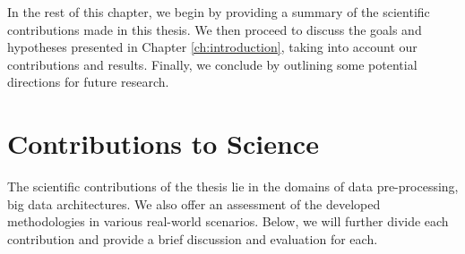 In the rest of this chapter, we begin by providing a summary of the scientific contributions made in this thesis. 
We then proceed to discuss the goals and hypotheses presented in Chapter \ref{ch:introduction}, taking into account our contributions and results. 
Finally, we conclude by outlining some potential directions for future research.

\section{Contributions to Science}
\label{sec:contributions_to_science}


\noindent The scientific contributions of the thesis lie in the domains of data pre-processing, big data architectures. 
We also offer an assessment of the developed methodologies in various real-world scenarios.
Below, we will further divide each contribution and provide a brief discussion and evaluation for each.\\

